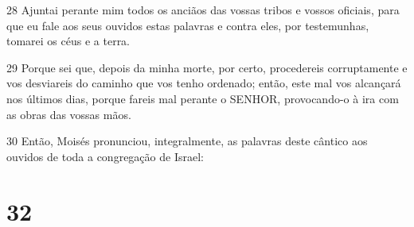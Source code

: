 \par 28 Ajuntai perante mim todos os anciãos das vossas tribos e vossos oficiais, para que eu fale aos seus ouvidos estas palavras e contra eles, por testemunhas, tomarei os céus e a terra.
\par 29 Porque sei que, depois da minha morte, por certo, procedereis corruptamente e vos desviareis do caminho que vos tenho ordenado; então, este mal vos alcançará nos últimos dias, porque fareis mal perante o SENHOR, provocando-o à ira com as obras das vossas mãos.
\par 30 Então, Moisés pronunciou, integralmente, as palavras deste cântico aos ouvidos de toda a congregação de Israel:

\chapter{32}

